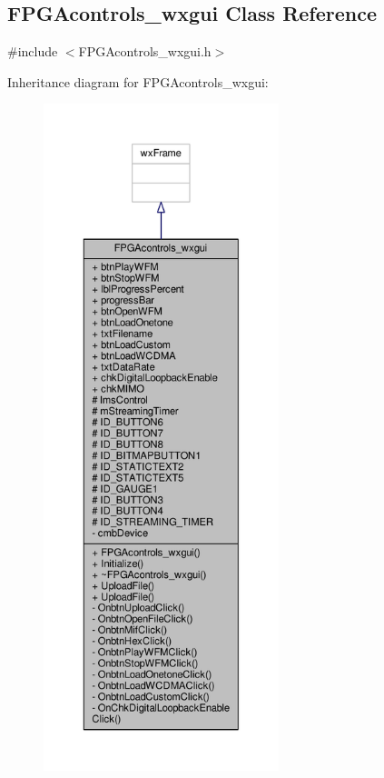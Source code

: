 \subsection{F\+P\+G\+Acontrols\+\_\+wxgui Class Reference}
\label{classFPGAcontrols__wxgui}


{\ttfamily \#include $<$F\+P\+G\+Acontrols\+\_\+wxgui.\+h$>$}



Inheritance diagram for F\+P\+G\+Acontrols\+\_\+wxgui\+:
\nopagebreak
\begin{figure}[H]
\begin{center}
\leavevmode
\includegraphics[height=550pt]{d1/d33/classFPGAcontrols__wxgui__inherit__graph}
\end{center}
\end{figure}


